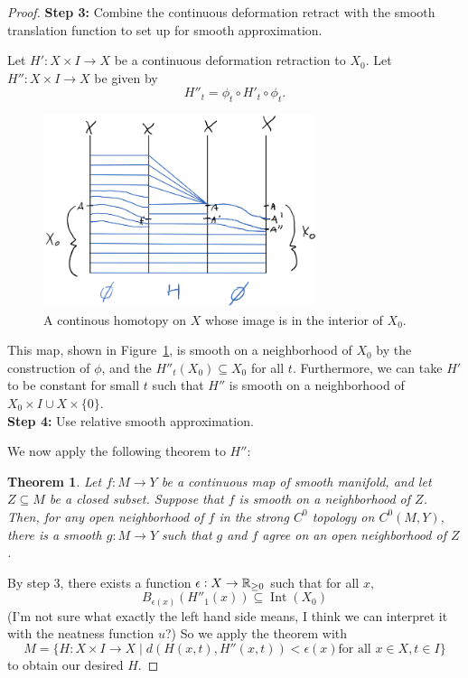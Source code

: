 \documentclass{article}
\newtheorem{theorem}{Theorem}[section]
\newtheorem{proposed work}[theorem]{Proposed Work}
\theoremstyle{definition}
\DeclareMathOperator{\Int}{Int}
\begin{document}
\begin{proof}
\noindent  \textbf{Step 3:} Combine the continuous deformation retract with the smooth translation function to set up for smooth approximation.

  Let $H':X\times I\to X$ be a continuous deformation retraction to $X_0$. Let $H'': X\times I\to X$ be given by
  \[
    H''_t = \phi_t\circ H'_t\circ \phi_t.
  \]

  \begin{figure}[h]
    \centering
    \includegraphics[width=8cm]{smooth_retraction}
    \caption{A continous homotopy on $X$ whose image is in the interior of $X_0$.\label{fig:smooth_retraction}}
  \end{figure}
  This map, shown in Figure~\ref{fig:smooth_retraction}, is smooth on a neighborhood of $X_0$ by the construction of $\phi$, and the $H''_t(X_0)\subseteq X_0$ for all $t$. Furthermore, we can take $H'$ to be constant for small $t$ such that $H''$ is smooth on a neighborhood of $X_0\times I\cup X\times\{0\}$.\\

\noindent\textbf{Step 4:} Use relative smooth approximation.

  We now apply the following theorem to $H''$:
  \begin{theorem}
    Let $f:M\to Y$ be a continuous map of smooth manifold, and let $Z\subseteq M$ be a closed subset. Suppose that $f$ is smooth on a neighborhood of $Z$. 
    Then, for any open neighborhood of $f$ in the strong $C^0$ topology on $C^0(M,Y)$, there is a smooth $g:M\to Y$ such that $g$ and $f$ agree on an open neighborhood of $Z$.
  \end{theorem}

  By step 3, there exists a function $\epsilon: X\to \mathbb R_{\ge 0}$ such that for all $x,$
  \[
B_{\epsilon(x)}(H''_1(x))\subseteq \Int(X_0)
\]
(I'm not sure what exactly the left hand side means, I think we can interpret it with the neatness function $u$?) So we apply the theorem with
\[
  M = \{H:X\times I\to X\mid d(H(x,t), H''(x,t))<\epsilon(x)\text{for all }x\in X, t\in I\}
\]
to obtain our desired $H$.
\end{proof}
\end{document}
